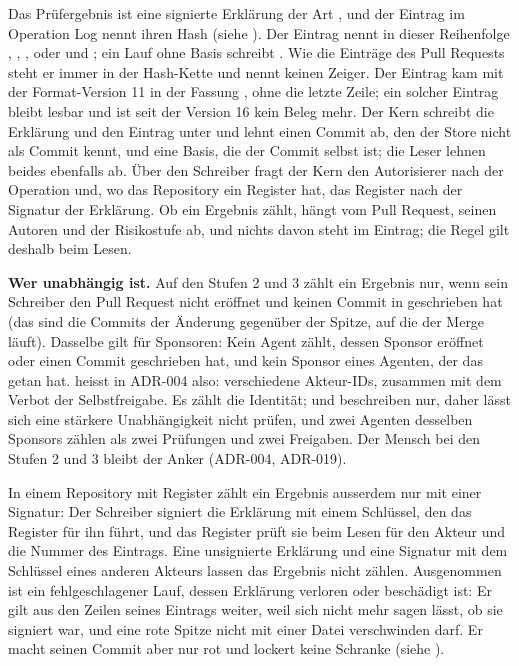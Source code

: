 Das Prüfergebnis ist eine signierte Erklärung der Art , und der Eintrag
 im Operation Log nennt ihren Hash (siehe ).
Der Eintrag nennt in dieser Reihenfolge , , ,
 oder  und ; ein Lauf ohne Basis
schreibt .
Wie die Einträge des Pull Requests steht er immer in der Hash-Kette und nennt keinen Zeiger.
Der Eintrag kam mit der Format-Version 11 in der Fassung , ohne die letzte Zeile;
ein solcher Eintrag bleibt lesbar und ist seit der Version 16 kein Beleg mehr.
Der Kern schreibt die Erklärung und den Eintrag unter  und lehnt einen Commit ab,
den der Store nicht als Commit kennt, und eine Basis, die der Commit selbst ist; die Leser lehnen
beides ebenfalls ab.
Über den Schreiber fragt der Kern den Autorisierer nach der Operation  und, wo das
Repository ein Register hat, das Register nach der Signatur der Erklärung.
Ob ein Ergebnis zählt, hängt vom Pull Request, seinen Autoren und der Risikostufe ab, und nichts
davon steht im Eintrag; die Regel gilt deshalb beim Lesen.

{\bf Wer unabhängig ist.}
Auf den Stufen 2 und 3 zählt ein Ergebnis nur, wenn sein Schreiber den Pull Request nicht
eröffnet und keinen Commit in  geschrieben hat (das sind die Commits der
Änderung gegenüber der Spitze, auf die der Merge läuft).
Dasselbe gilt für Sponsoren: Kein Agent zählt, dessen Sponsor eröffnet oder einen Commit
geschrieben hat, und kein Sponsor eines Agenten, der das getan hat.
 heisst in ADR-004 also: verschiedene Akteur-IDs, zusammen mit dem Verbot
der Selbstfreigabe.
Es zählt die Identität;  und  beschreiben nur, daher lässt sich eine
stärkere Unabhängigkeit nicht prüfen,
und zwei Agenten desselben Sponsors zählen als zwei Prüfungen und zwei Freigaben.
Der Mensch bei den Stufen 2 und 3 bleibt der Anker (ADR-004, ADR-019).

In einem Repository mit Register zählt ein Ergebnis ausserdem nur mit einer Signatur:
Der Schreiber signiert die Erklärung mit einem Schlüssel, den das Register für ihn führt,
und das Register prüft sie beim Lesen für den Akteur und die Nummer des Eintrags.
Eine unsignierte Erklärung und eine Signatur mit dem Schlüssel eines anderen Akteurs lassen
das Ergebnis nicht zählen.
Ausgenommen ist ein fehlgeschlagener Lauf, dessen Erklärung verloren oder beschädigt ist: Er
gilt aus den Zeilen seines Eintrags weiter, weil sich nicht mehr sagen lässt, ob sie signiert
war, und eine rote Spitze nicht mit einer Datei verschwinden darf.
Er macht seinen Commit aber nur rot und lockert keine Schranke (siehe
).

